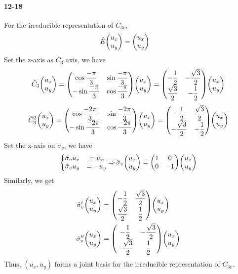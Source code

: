 \documentclass[a4paper]{article}
\DeclareMathOperator{\dra}{\Rightarrow}
\newcommand{\ex}[1]{\paragraph{12-#1}}
\numberwithin{equation}{section}
\begin{document}
\ex{18}
For the irreducible representation of $ C_{3v} $,
\begin{align}
\hat{E}\mqty(u_x\\ u_y) &= \mqty(u_x\\ u_y)
\end{align}
Set the z-axis as $ C_3 $ axis, we have
\begin{equation}\label{key}
\hat{C}_3\mqty(u_x\\ u_y) = \mqty(\cos\dfrac{-\pi}{3} & \sin\dfrac{-\pi}{3}\\ -\sin\dfrac{-\pi}{3} & \cos\dfrac{-\pi}{3})\mqty(u_x\\ u_y) 
= \mqty(-\dfrac{1}{2} & -\dfrac{\sqrt{3}}{2}\\ \dfrac{\sqrt{3}}{2} & -\dfrac{1}{2})\mqty(u_x\\ u_y)
\end{equation}
\begin{equation}\label{key}
\hat{C}_3^2\mqty(u_x\\ u_y) = \mqty(\cos\dfrac{-2\pi}{3} & \sin\dfrac{-2\pi}{3}\\ -\sin\dfrac{-2\pi}{3} & \cos\dfrac{-2\pi}{3})\mqty(u_x\\ u_y) 
= \mqty(-\dfrac{1}{2} & \dfrac{\sqrt{3}}{2}\\ -\dfrac{\sqrt{3}}{2} & -\dfrac{1}{2})\mqty(u_x\\ u_y)
\end{equation}
Set the x-axis on $ \sigma_v $, we have
\begin{equation}\label{key}
\left\{\mqty{\hat\sigma_v u_x &= u_x\\ \hat\sigma_v u_y &= -u_y} \right.
\dra \hat\sigma_v\mqty(u_x\\ u_y) = \mqty(1 & 0\\ 0 & -1)\mqty(u_x\\ u_y)
\end{equation}
Similarly, we get
\begin{align}
\hat\sigma_v'\mqty(u_x\\ u_y) &= \mqty(-\dfrac{1}{2} & \dfrac{\sqrt{3}}{2}\\ \dfrac{\sqrt{3}}{2} & \dfrac{1}{2})\mqty(u_x\\ u_y)\\
\hat\sigma_v''\mqty(u_x\\ u_y) &= \mqty(-\dfrac{1}{2} & -\dfrac{\sqrt{3}}{2}\\ -\dfrac{\sqrt{3}}{2} & \dfrac{1}{2})\mqty(u_x\\ u_y)
\end{align}
Thus, $ (u_x, u_y) $ forms a joint basis for the irreducible representation of $ C_{3v} $.
\end{document}

